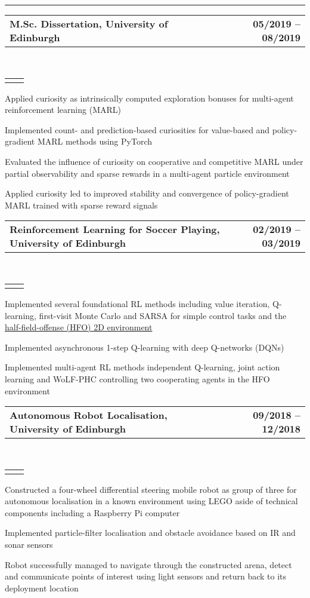 \documentclass[]{lukas-cv}
\makeatletter
\newcommand{\headerrow}[2]
{\begin{tabular*}{\linewidth}{l@{\extracolsep{\fill}}r}
	\fontspec{Helvetica}\fontsize{12pt}{12pt}\selectfont\bfseries{\color{subheadings}#1} &
	\fontspec{Helvetica}\fontsize{12pt}{12pt}\selectfont\bfseries{\color{subheadings}#2} \\
\end{tabular*}}
\newcommand{\locationrow}[2]
{\begin{tabular*}{\linewidth}{l@{\extracolsep{\fill}}r}
        \color{headings}\scshape\fontspec{Heiti TC Medium}\fontsize{10pt}{12pt}\selectfont{#1}  &
        \color{headings}\scshape\fontspec{Heiti TC Medium}\fontsize{10pt}{12pt}\selectfont{#2}  \\
\end{tabular*}}
\makeatother
\begin{document}
\hrule
\vspace{0.4em}

\noindent
\headerrow{M.Sc. Dissertation, University of Edinburgh}{05/2019 -- 08/2019}
\\
\locationrow{Autonomous Agents Research Group}{}
\begin{tightitemize}{1.7em}
    \item Applied curiosity as intrinsically computed exploration bonuses for multi-agent reinforcement learning (MARL)
    \item Implemented count- and prediction-based curiosities for value-based and policy-gradient MARL methods using PyTorch
    \item Evaluated the influence of curiosity on cooperative and competitive MARL under partial observability and sparse rewards in a multi-agent particle environment
    \item Applied curiosity led to improved stability and convergence of policy-gradient MARL trained with sparse reward signals
\end{tightitemize}
\largesectionsep

\noindent
\headerrow{Reinforcement Learning for Soccer Playing, University of Edinburgh}{02/2019 -- 03/2019}
\\
\locationrow{Project for Reinforcement Learning Lecture}{}
\begin{tightitemize}{1.7em}
    \item Implemented several foundational RL methods including value iteration, Q-learning, first-visit Monte Carlo and SARSA for simple control tasks and the \href{https://github.com/LARG/HFO}{half-field-offense (HFO) 2D environment}
    \item Implemented asynchronous 1-step Q-learning with deep Q-networks (DQNs)
    \item Implemented multi-agent RL methods independent Q-learning, joint action learning and WoLF-PHC controlling two cooperating agents in the HFO environment
\end{tightitemize}
\largesectionsep

\noindent
\headerrow{Autonomous Robot Localisation, University of Edinburgh}{09/2018 -- 12/2018}
\\
\locationrow{Group Project for Robotics: Science and Systems Lecture}{}
\begin{tightitemize}{1.7em}
    \item Constructed a four-wheel differential steering mobile robot as group of three for autonomous localisation in a 
    known environment using LEGO aside of technical components including a Raspberry Pi computer
    \item Implemented particle-filter localisation and obstacle avoidance based on IR and sonar sensors
    \item Robot successfully managed to navigate through the constructed arena, detect and communicate points of
    interest using light sensors and return back to its deployment location
\end{tightitemize}
\largesectionsep
\end{document}

